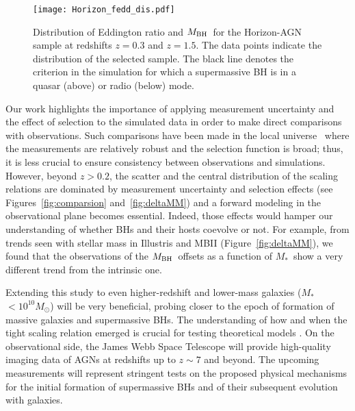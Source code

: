 \documentclass[twocolumn]{aastex631}
\def\smass{{$M_*$}}
\def\mbh{$M_{\rm BH}$}
\begin{document}
\begin{figure}
\centering
\texttt{[image: Horizon\_fedd\_dis.pdf]}\\
\caption{\label{fig:fedd} 
Distribution of Eddington ratio and \mbh\ for the Horizon-AGN sample at redshifts $z=0.3$ and $z=1.5$. The data points indicate the distribution of the selected sample. The black line denotes the criterion in the simulation for which a supermassive BH is in a quasar (above) or radio (below) mode.}
\end{figure} 

Our work highlights the importance of applying measurement uncertainty and the effect of selection to the simulated data in order to make direct comparisons with observations. Such comparisons have been made in the local universe~\citep[e.g.,][]{Habouzit2021} where the measurements are relatively robust and the selection function is broad; thus, it is less crucial to ensure consistency between observations and simulations. However, beyond $z>0.2$, the scatter and the central distribution of the scaling relations are dominated by measurement uncertainty and selection effects (see Figures~\ref{fig:comparsion} and~\ref{fig:deltaMM}) and a forward modeling in the observational plane becomes essential. Indeed, those effects would hamper our understanding of whether BHs and their hosts coevolve or not. For example, from trends seen with stellar mass in Illustris and MBII (Figure~\ref{fig:deltaMM}), we found that the observations of the \mbh\ offsets as a function of \smass\  show a very different trend from the intrinsic one.


Extending this study to even higher-redshift and lower-mass galaxies (\smass\ $<10^{10}M_{\odot}$) will be very beneficial, probing closer to the epoch of formation of massive galaxies and supermassive BHs. The understanding of how and when the tight scaling relation emerged is crucial for testing theoretical models \citep{Volonteri2021}. On the observational side, the James Webb Space Telescope will provide high-quality imaging data of AGNs at redshifts up to $z\sim7$ and beyond. The upcoming measurements will represent stringent tests on the proposed physical mechanisms for the initial formation of supermassive BHs and of their subsequent evolution with galaxies.
\end{document}
